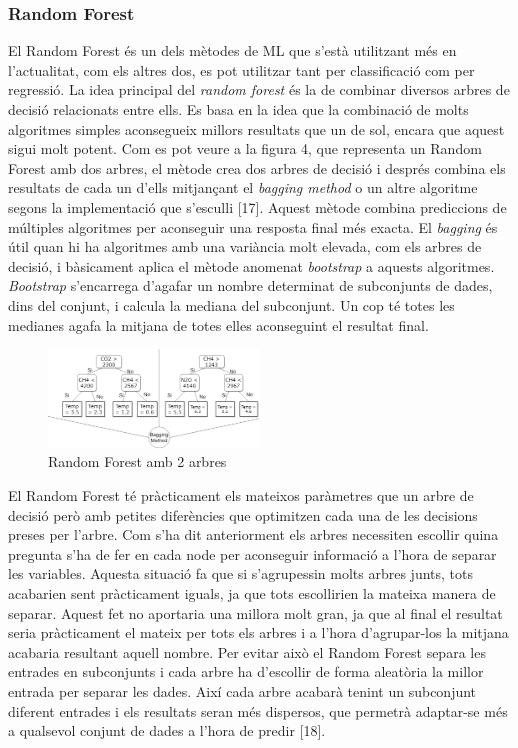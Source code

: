 \documentclass[10pt,a4paper,twocolumn,twoside]{article}
\begin{document}
\subsubsection{Random Forest}
El Random Forest és un dels mètodes de ML que s'està utilitzant més en l'actualitat, com els altres dos, es pot utilitzar tant per classificació com per regressió. La idea principal del \textit{random forest} és la de combinar diversos arbres de decisió relacionats entre ells. Es basa en la idea que la combinació de molts algoritmes simples aconsegueix millors resultats que un de sol, encara que aquest sigui molt potent. Com es pot veure a la figura 4, que representa un Random Forest amb dos arbres, el mètode crea dos arbres de decisió i després combina els resultats de cada un d'ells mitjançant el \textit{bagging method} o un altre algoritme segons la implementació que s'esculli [17]. Aquest mètode combina prediccions de múltiples algoritmes per aconseguir una resposta final més exacta. El \textit{bagging} és útil quan hi ha algoritmes amb una variància molt elevada, com els arbres de decisió, i bàsicament aplica el mètode anomenat \textit{bootstrap} a aquests algoritmes. \textit{Bootstrap} s'encarrega d'agafar un nombre determinat de subconjunts de dades, dins del conjunt, i calcula la mediana del subconjunt. Un cop té totes les medianes agafa la mitjana de totes elles aconseguint el resultat final.
\begin{figure}[!h]
\centering
	\includegraphics[width=0.5\textwidth]{../img/randomForest}
	\caption{Random Forest amb 2 arbres}
	\label{fig-RandomForest}
\end{figure}

El Random Forest té pràcticament els mateixos paràmetres que un arbre de decisió però amb petites diferències que optimitzen cada una de les decisions preses per l'arbre. Com s'ha dit anteriorment els arbres necessiten escollir quina pregunta s'ha de fer en cada node per aconseguir informació a l'hora de separar les variables. Aquesta situació fa que si s'agrupessin molts arbres junts, tots acabarien sent pràcticament iguals, ja que tots escollirien la mateixa manera de separar. Aquest fet no aportaria una millora molt gran, ja que al final el resultat seria pràcticament el mateix per tots els arbres i a l'hora d'agrupar-los la mitjana acabaria resultant aquell nombre. Per evitar això el Random Forest separa les entrades en subconjunts i cada arbre ha d'escollir de forma aleatòria la millor entrada per separar les dades. Així cada arbre acabarà tenint un subconjunt diferent entrades i els resultats seran més dispersos, que permetrà adaptar-se més a qualsevol conjunt de dades a l'hora de predir [18].
\end{document}
